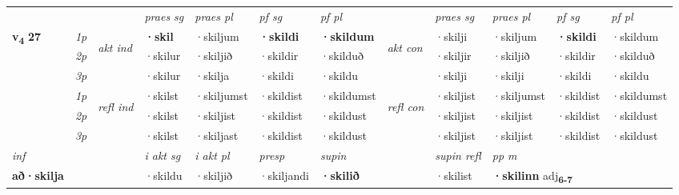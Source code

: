\begin{longtable}[l]{X>{\footnotesize\itshape}llXXXXlXXXX}
 & &   & \textit{praes sg}  & \textit{praes pl}    & \textit{ pf sg} & \textit{pf pl} & & \textit{praes sg}  & \textit{praes pl}    & \textit{pf sg} & \textit{pf pl }  \\ \cmidrule{4-7} \cmidrule{9-12}
 \multirow{2}{*}{{{\textbf{v{\textsubscript{4}}} \Large{\textbf{27}}}}}  & 1p & \multirow{3}{*}{\begin{turn}{90}\textit{akt ind}\end{turn}} & \textbf{·skil} & ·skiljum & \textbf{·skildi} & \textbf{·skildum} & \multirow{3}{*}{\begin{turn}{90}\textit{akt con}\end{turn}} &·skilji & ·skiljum & \textbf{·skildi} & ·skildum\\*
 & 2p &  &  ·skilur  & ·skiljið & ·skildir & ·skilduð & & ·skiljir & ·skiljið & ·skildir & ·skilduð \\*
 & 3p &  & ·skilur & ·skilja & ·skildi & ·skildu & & ·skilji & ·skilji& ·skildi & ·skildu \\*
\cmidrule{4-7} \cmidrule{9-12}
 & 1p & \multirow{3}{*}{\begin{turn}{90}\textit{refl ind}\end{turn}}  & ·skilst & ·skiljumst & ·skildist & ·skildumst & \multirow{3}{*}{\begin{turn}{90}\textit{refl con}\end{turn}}  &·skiljist & ·skiljumst & ·skildist & ·skildumst \\*
 & 2p &  & ·skilst & ·skiljist & ·skildist & ·skildust & &·skiljist & ·skiljist & ·skildist & ·skildust \\*
 & 3p  & & ·skilst & ·skiljast & ·skildist & ·skildust & & ·skiljist & ·skiljist& ·skildist & ·skildust \\*
\cmidrule{4-7} \cmidrule{9-12}

   {\textit{inf}} & &  & \textit{i akt sg} & \textit{i akt pl}   & \textit{presp} & \textit{supin} && \textit{supin refl} & \textit{pp m} \\*
  {\textbf{að\allowbreak ·skilja}} & && ·skildu  & ·skiljið   & ·skiljandi &  \textbf{·skilið} && ·skilist & \multicolumn{2}{l}{\textbf{·skilinn} adj\textbf{\textsubscript{6-7}}} \\*

\midrule


\end{longtable}
